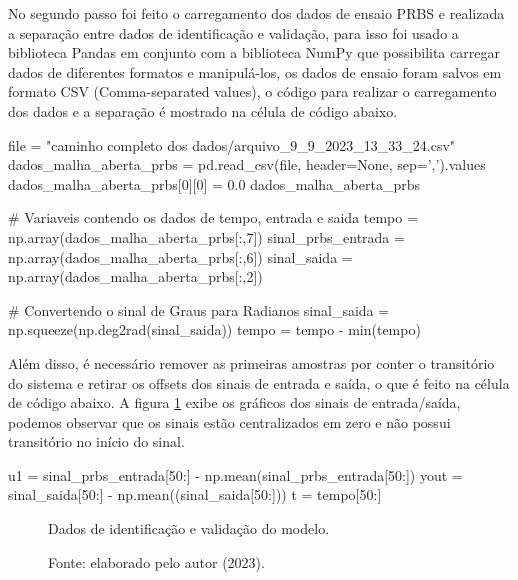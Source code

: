 No segundo passo foi feito o carregamento dos dados de ensaio PRBS e realizada a separação entre dados de identificação e validação, para isso foi usado a biblioteca Pandas em conjunto com a biblioteca NumPy que possibilita carregar dados de diferentes formatos e manipulá-los, os dados de ensaio foram salvos em formato CSV (Comma-separated values), o código para realizar o carregamento dos dados e a separação é mostrado na célula de código abaixo.

\vspace{0.5cm}

\begin{python}
file = "caminho completo dos  dados/arquivo_9_9_2023_13_33_24.csv"
dados_malha_aberta_prbs = pd.read_csv(file, header=None, sep=',').values
dados_malha_aberta_prbs[0][0] = 0.0
dados_malha_aberta_prbs

# Variaveis contendo os dados de tempo, entrada e saida
tempo = np.array(dados_malha_aberta_prbs[:,7])
sinal_prbs_entrada  = np.array(dados_malha_aberta_prbs[:,6])
sinal_saida = np.array(dados_malha_aberta_prbs[:,2])

# Convertendo o sinal de Graus para Radianos
sinal_saida = np.squeeze(np.deg2rad(sinal_saida))
tempo = tempo - min(tempo)
\end{python}


Além disso, é necessário remover as primeiras amostras por conter o transitório do sistema e retirar os offsets dos sinais de entrada e saída, o que é feito na célula de código abaixo. A figura \ref{fig3:image_20} exibe os gráficos dos sinais de entrada/saída, podemos observar que os sinais estão centralizados em zero e não possui transitório no início do sinal.

\vspace{0.5cm}

\begin{python}
u1 = sinal_prbs_entrada[50:] - np.mean(sinal_prbs_entrada[50:])
yout = sinal_saida[50:] - np.mean((sinal_saida[50:]))
t = tempo[50:]
\end{python}

\begin{figure}[!h]
	\centering
	\caption{Dados de identificação e validação do modelo.}
	\caption*{Fonte: elaborado pelo autor (2023).}
	\label{fig3:image_20}
\end{figure}

